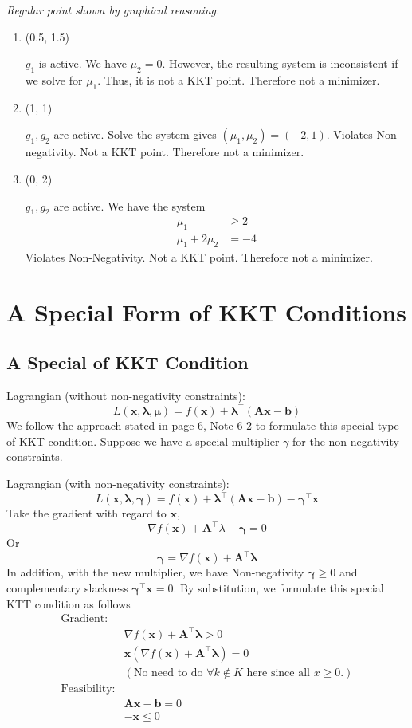 \textit{Regular point shown by graphical reasoning.}

\begin{enumerate}
\item (0.5, 1.5)
\par $g_1$ is active. We have $\mu_2= 0$. However, the resulting system is inconsistent if we solve for $\mu_1$. Thus, it is not a KKT point. Therefore not a minimizer.


\item (1, 1)
\par $g_1, g_2$ are active. Solve the system gives $(\mu_1, \mu_2) = (-2, 1)$. Violates Non-negativity. Not a KKT point. Therefore not a minimizer.

\item (0, 2)
\par $g_1, g_2$ are active. We have the system 
\begin{align*}
\mu_1 &\geq 2 \\
\mu_1 + 2\mu_2 &= -4
\end{align*}
Violates Non-Negativity. Not a KKT point. Therefore not a minimizer. 

\end{enumerate}
\section{A Special Form of KKT Conditions}

\subsection{A Special of KKT Condition}
Lagrangian (without non-negativity constraints):
\[
L(\bm{x, \lambda, \mu}) = f(\bm x) + \bm{\lambda}^\intercal (\bm{Ax - b})
\]
We follow the approach stated in page 6, Note 6-2 to formulate this special type of KKT condition. Suppose we have a special multiplier $\gamma$ for the non-negativity constraints. 
\par Lagrangian (with non-negativity constraints):
\[
L(\bm{x, \lambda, \gamma}) = f(\bm x) + \bm{\lambda}^\intercal (\bm{Ax - b}) - \bm\gamma^ \intercal \bm x
\]
Take the gradient with regard to $\bm x$,
\[
\nabla f(\bm x) + \bm A ^\intercal \lambda - \bm\gamma = 0
\]
Or
\[
\bm \gamma  = \nabla f(\bm x) + \bm A ^\intercal \bm\lambda
\]
In addition, with the new multiplier, we have Non-negativity $\bm \gamma \geq 0$ and complementary slackness $\bm \gamma^\intercal \bm x = 0$. By substitution, we formulate this special KTT condition as follows
\begin{align*}
\text{Gradient:}&\\
&\nabla f(\bm x) + \bm A ^\intercal \bm \lambda > 0\\
&\bm x (\nabla f(\bm x) + \bm A ^\intercal \bm \lambda)  =  0 \\
& (\text{No need to do $\forall k \not\in K$ here since all $x \geq 0$.})\\
\text{Feasibility:}&\\
&\bm{Ax - b} = 0\\
& -\bm x \leq 0\\
\end{align*}

